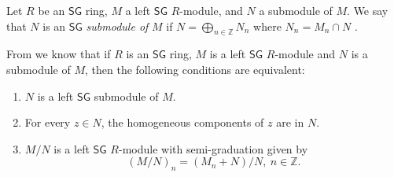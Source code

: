 \documentclass[reqno]{amsart}
\theoremstyle{definition}
\theoremstyle{remark}
\numberwithin{equation}{section}
\begin{document}
Let $R$ be an $\mathsf{SG}$ ring, $M$ a left $\mathsf{SG}$ $R$-module, and $N$ a submodule of $M$. We say that $N$ is an $\mathsf{SG}$ {\em submodule of} $M$ if $N=\bigoplus\limits_{n\in\mathbb{Z}}N_n$ where $N_n=M_n\cap N$ \cite[Definition 2.3]{LezamaLatorre2017}.

From \cite[Proposition 2.6]{LezamaLatorre2017} we know that if $R$ is an $\mathsf{SG}$ ring, $M$ is a left $\mathsf{SG}$ $R$-module and $N$ is a submodule of $M$, then the following conditions are equivalent:
\begin{enumerate}
        \item [\rm (1)] $N$ is a left $\mathsf{SG}$ submodule of $M$.
        \item [\rm (2)] For every $z\in N$, the homogeneous components of $z$ are in $N$.
        \item [\rm (3)] $M/N$ is a left $\mathsf{SG}$ $R$-module with semi-graduation given by
        \[
        (M/N)_n=(M_n+N)/N,\ n\in\mathbb{Z}.
        \]
\end{enumerate}


 
 
\end{document}
